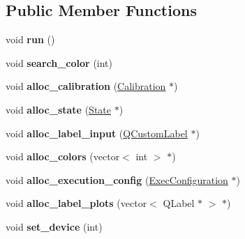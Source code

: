 \subsection*{Public Member Functions}
\begin{DoxyCompactItemize}
\item 
void {\bfseries run} ()\hypertarget{classvision_ad213bf1ae76ed6a489390c501fe1b4e0}{}\label{classvision_ad213bf1ae76ed6a489390c501fe1b4e0}

\item 
void {\bfseries search\+\_\+color} (int)\hypertarget{classvision_a908d37e077c8844e2bfd5b38a1f65577}{}\label{classvision_a908d37e077c8844e2bfd5b38a1f65577}

\item 
void {\bfseries alloc\+\_\+calibration} (\hyperlink{structcommon_1_1Calibration}{Calibration} $\ast$)\hypertarget{classvision_a81fd57a35d8e331f844e1d276d8272f6}{}\label{classvision_a81fd57a35d8e331f844e1d276d8272f6}

\item 
void {\bfseries alloc\+\_\+state} (\hyperlink{structcommon_1_1State}{State} $\ast$)\hypertarget{classvision_a4f8eec2ffc63e3a2b3e76c347b13f537}{}\label{classvision_a4f8eec2ffc63e3a2b3e76c347b13f537}

\item 
void {\bfseries alloc\+\_\+label\+\_\+input} (\hyperlink{classQCustomLabel}{Q\+Custom\+Label} $\ast$)\hypertarget{classvision_a5951eb6e1bb8582b3f01dec96d3ad3ac}{}\label{classvision_a5951eb6e1bb8582b3f01dec96d3ad3ac}

\item 
void {\bfseries alloc\+\_\+colors} (vector$<$ int $>$ $\ast$)\hypertarget{classvision_a5d366b880029815afed304c1d2d29bfc}{}\label{classvision_a5d366b880029815afed304c1d2d29bfc}

\item 
void {\bfseries alloc\+\_\+execution\+\_\+config} (\hyperlink{structcommon_1_1ExecConfiguration}{Exec\+Configuration} $\ast$)\hypertarget{classvision_a3d623a2e736f204716f1d44bf496823f}{}\label{classvision_a3d623a2e736f204716f1d44bf496823f}

\item 
void {\bfseries alloc\+\_\+label\+\_\+plots} (vector$<$ Q\+Label $\ast$ $>$ $\ast$)\hypertarget{classvision_a75142dd50f6818ae2d954a1070b7e721}{}\label{classvision_a75142dd50f6818ae2d954a1070b7e721}

\item 
void {\bfseries set\+\_\+device} (int)\hypertarget{classvision_af1d8cd9e34b8bd73d9c8b6eabc235936}{}\label{classvision_af1d8cd9e34b8bd73d9c8b6eabc235936}


\end{DoxyCompactItemize}
